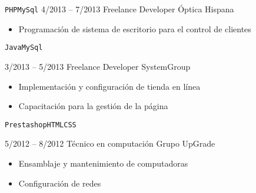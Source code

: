 \begin{entrylist}
{		    \texttt{PHP}\slashsep\texttt{MySql}
        }
	\entry
		{4/2013 -- 7/2013}
		{Freelance Developer}
		{Óptica Hispana}
		{
		    \vspace{-5mm}
    	    \begin{itemize}
    	        \setlength\itemsep{0pt}
    	        \item Programación de sistema de escritorio para el control de clientes
    	    \end{itemize}
		    \texttt{Java}\slashsep\texttt{MySql}
        }
	\entry
		{3/2013 -- 5/2013}
		{Freelance Developer}
		{SystemGroup}
		{
		    \vspace{-5mm}
		    \begin{itemize}
		        \setlength\itemsep{0pt}
		        \item Implementación y configuración de tienda en línea
		        \item Capacitación para la gestión de la página
		    \end{itemize}
		    \texttt{Prestashop}\slashsep\texttt{HTML}\slashsep\texttt{CSS}
        }
	\entry
		{5/2012 -- 8/2012}
		{Técnico en computación}
		{Grupo UpGrade}
    	{
    	    \vspace{-5mm}
    	    \begin{itemize}
    	        \setlength\itemsep{0pt}
    	        \item Ensamblaje y mantenimiento de computadoras
    	        \item Configuración de redes
    	    \end{itemize}
        }
\end{entrylist}